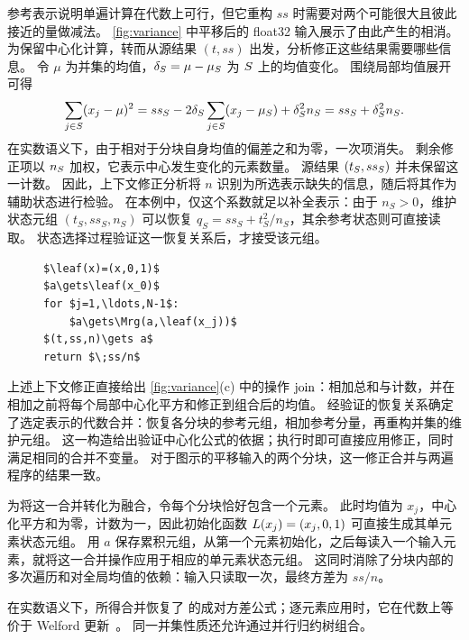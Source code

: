 参考表示说明单遍计算在代数上可行，但它重构 $ss$ 时需要对两个可能很大且彼此接近的量做减法。
\cref{fig:variance} 中平移后的 float32 输入展示了由此产生的相消。
为保留中心化计算，\sys 转而从源结果 $(t,ss)$ 出发，分析修正这些结果需要哪些信息。
令 $\mu$ 为并集的均值，$\delta_S=\mu-\mu_S$ 为 $S$ 上的均值变化。
围绕局部均值展开可得
\begin{equation}
\label{eq:variance-rebase}
\sum_{j\in S}(x_j-\mu)^2
=ss_S-2\delta_S\sum_{j\in S}(x_j-\mu_S)+\delta_S^2 n_S
=ss_S+\delta_S^2 n_S.
\end{equation}
在实数语义下，由于相对于分块自身均值的偏差之和为零，一次项消失。
剩余修正项以 $n_S$ 加权，它表示中心发生变化的元素数量。
源结果 $(t_S,ss_S)$ 并未保留这一计数。
因此，上下文修正分析将 $n$ 识别为所选表示缺失的信息，\sys 随后将其作为辅助状态进行检验。
在本例中，仅这个系数就足以补全表示：由于 $n_S>0$，维护状态元组 $(t_S,ss_S,n_S)$ 可以恢复 $q_S=ss_S+t_S^2/n_S$，其余参考状态则可直接读取。
状态选择过程验证这一恢复关系后，才接受该元组。

\begin{figure}
\begin{lstlisting}[style=pseudocode,caption={Single pass with maintained states.},label={lst:variance-after}]
$\leaf(x)=(x,0,1)$
$a\gets\leaf(x_0)$
for $j=1,\ldots,N-1$:
    $a\gets\Mrg(a,\leaf(x_j))$
$(t,ss,n)\gets a$
return $\;ss/n$
\end{lstlisting}
\end{figure}
上述上下文修正直接给出 \cref{fig:variance}(c) 中的操作 $\operatorname{join}$：相加总和与计数，并在相加之前将每个局部中心化平方和修正到组合后的均值。
经验证的恢复关系确定了选定表示的代数合并：恢复各分块的参考元组，相加参考分量，再重构并集的维护元组。
这一构造给出验证中心化公式的依据；执行时即可直接应用修正，同时满足相同的合并不变量。
对于图示的平移输入的两个分块，这一修正合并与两遍程序的结果一致。

为将这一合并转化为融合，令每个分块恰好包含一个元素。
此时均值为 $x_j$，中心化平方和为零，计数为一，因此初始化函数 $L(x_j)=(x_j,0,1)$ 可直接生成其单元素状态元组。
 用 $a$ 保存累积元组，从第一个元素初始化，之后每读入一个输入元素，就将这一合并操作应用于相应的单元素状态元组。
这同时消除了分块内部的多次遍历和对全局均值的依赖：输入只读取一次，最终方差为 $ss/n$。

在实数语义下，所得合并恢复了 \citet{chan} 的成对方差公式；逐元素应用时，它在代数上等价于 Welford 更新~\citep{welford}。
同一并集性质还允许通过并行归约树组合。
\endgroup
